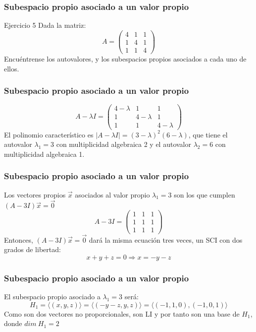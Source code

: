 \documentclass{beamer}
\begin{document}
\begin{frame}
\frametitle{Subespacio propio asociado a un valor propio}
\begin{block}{Ejercicio 5}
Dada la matriz: 
\[A=\left(\begin{array}{rrr}4 & 1 & 1 \\1 & 4 & 1 \\1 & 1 & 4\end{array}\right)\]
Encu\'entrense los autovalores, y los subespacios propios asociados a cada uno de ellos. 
\end{block}
\end{frame}

\begin{frame}
\frametitle{Subespacio propio asociado a un valor propio}

\[A-\lambda I=\left(\begin{array}{ccc}4-\lambda & 1 & 1 \\1 & 4-\lambda & 1 \\1 & 1 & 4-\lambda\end{array}\right)\]
El polinomio caracter\'istico es $|A-\lambda I | = (3-\lambda)^2(6-\lambda)$, que tiene el autovalor $\lambda_1=3$ con multiplicidad algebraica 2 y el autovalor $\lambda_2=6$ con multiplicidad algebraica 1. 
\end{frame}

\begin{frame}
\frametitle{Subespacio propio asociado a un valor propio}
Los vectores propios $\vec x$ asociados al valor propio $\lambda_1 = 3$ son los que cumplen $(A-3I)\vec x = \vec 0$
\[A-3 I=\left(\begin{array}{ccc}1 & 1 & 1 \\1 & 1 & 1 \\1 & 1 & 1\end{array}\right)\]
Entonces, $(A-3I)\vec x = \vec 0$ dar\'a la misma ecuaci\'on tres veces, un SCI con dos grados de libertad:
\[x+y+z = 0\Rightarrow x = -y-z\]
\end{frame}



\begin{frame}
\frametitle{Subespacio propio asociado a un valor propio}
El subespacio propio asociado a $\lambda_1=3$ ser\'a:
\[H_1 = \langle (x,y,z) \rangle = \langle (-y-z,y,z) \rangle = \langle (-1,1,0), (-1,0,1) \rangle\]
Como son dos vectores no proporcionales, son LI y por tanto son una base de $H_1$, donde $dim\ H_1 = 2$
\end{frame}
\end{document}
